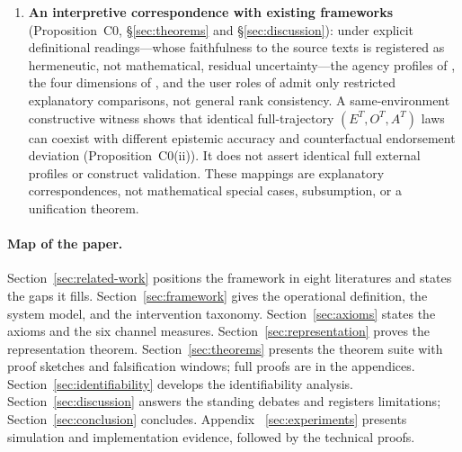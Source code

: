 \begin{enumerate}
separate precommitted open-loop execution stream and sampled negative controls.
Layer-aware certificates include explicit channel states, data-driven
below/above/indeterminate near-zero detection, and three-state order/semantic
sensitivity. Above-limit composite intervals are \emph{share-conditional}.
Matched supplementary diagnostics compare basic/percentile constructions and
fixed/joint channel propagation on common replicates, without claiming an
identified conditional-design-versus-bias decomposition; envelope containment
remains distinct from sampling coverage.
Exact convention composites ($0.4609$, $0.0004$, $0.4012$) are model anchors:
the near-zero NRI endpoint is not recovered by plug-in sampling, and its honest
data verdict at $n=8{,}192$ is \emph{indeterminate}. X5-c remains
model-sensitive; C0-CF is a same-environment construction; BB-2 calibrates the
black-box premise; and exact log-domain simplex bounds, rather than the older
Kendall battery, are primary for weight sensitivity. Accordingly, the paper is
a conditional conceptual and mathematical audit framework with executable model
checks, not a deployment-ready tool or cross-substrate measurement standard. It
claims no cross-substrate construct validity, universal interval coverage,
statistical consistency, or external validation of real-LLM or human autonomy.
\item \textbf{An interpretive correspondence with existing frameworks}
(Proposition~C0,
\S\ref{sec:theorems} and \S\ref{sec:discussion}): under explicit definitional
readings---whose faithfulness to the source texts is registered as
hermeneutic, not mathematical, residual uncertainty---the agency profiles of
\citet{dung2024}, the four dimensions of \citet{kasirzadeh2025}, and the
user roles of \citet{feng2025} admit only restricted explanatory comparisons,
not general rank consistency. A same-environment constructive witness shows
that identical full-trajectory $(E^T,O^T,A^T)$ laws can coexist with different
epistemic accuracy and counterfactual endorsement deviation
(Proposition~C0(ii)). It does not assert identical full external profiles or
construct validation. These mappings are explanatory correspondences, not
mathematical special cases, subsumption, or a unification theorem.
\end{enumerate}

\paragraph{Map of the paper.} Section~\ref{sec:related-work} positions the
framework in eight literatures and states the gaps it fills.
Section~\ref{sec:framework} gives the operational definition, the system
model, and the intervention taxonomy. Section~\ref{sec:axioms} states the axioms and
the six channel measures. Section~\ref{sec:representation} proves the
representation theorem. Section~\ref{sec:theorems} presents the theorem suite
with proof sketches and falsification windows; full proofs are in the
appendices. Section~\ref{sec:identifiability} develops the identifiability
analysis. Section~\ref{sec:discussion} answers the standing debates and
registers limitations; Section~\ref{sec:conclusion} concludes. Appendix~
\ref{sec:experiments} presents simulation and implementation evidence,
followed by the technical proofs.
